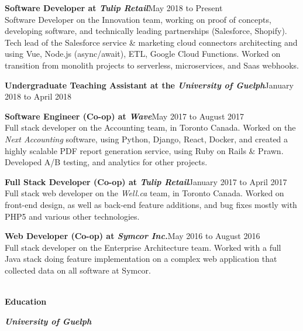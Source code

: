\documentclass[9pt]{extarticle}
\begin{document}
{    \textbf{Software Developer at \textit{Tulip Retail}}{\color{darkgrey}\hfill{\small{May 2018 to Present\\[5pt]}}
        Software Developer on the Innovation team, working on proof of concepts, developing software, and technically leading partnerships (Salesforce, Shopify). Tech lead of the Salesforce service \& marketing cloud connectors architecting and using Vue, Node.js (async/await), ETL, Google Cloud Functions. Worked on transition from monolith projects to serverless, microservices, and Saas webhooks.
    }

    \textbf{Undergraduate Teaching Assistant at the \textit{University of Guelph}}{\color{darkgrey}\hfill{\small{January 2018 to April 2018}}
    }

    \textbf{Software Engineer (Co-op) at \textit{Wave}}{\color{darkgrey}\hfill{\small{May 2017 to August 2017\\[5pt]}}
        Full stack developer on the Accounting team, in Toronto Canada. Worked on the \textit{Next Accounting} software, using Python, Django, React, Docker, and created a highly scalable PDF report generation service, using Ruby on Rails \& Prawn. Developed A/B testing, and analytics for other projects.\\
    }

    \textbf{Full Stack Developer (Co-op) at \textit{Tulip Retail}}{\color{darkgrey}\hfill{\small{January 2017 to April 2017\\[5pt]}}
        Full stack web developer on the \textit{Well.ca} team, in Toronto Canada. Worked on front-end design, as well as back-end feature additions, and bug fixes mostly with PHP5 and various other technologies. \\
    }

    \textbf{Web Developer (Co-op) at \textit{Symcor Inc.}}{\color{darkgrey}\hfill{\small{May 2016 to August 2016\\[5pt]}}
        Full stack developer on the Enterprise Architecture team. Worked with a full Java stack doing feature implementation on a complex web application that collected data on all software at Symcor. \\
    }

    {\color{lightgrey}{\centerline{\rule{17cm}{0.4pt}}}}
    \begin{Large}
        \color{em-light}\textbf{\\[5pt]Education\\}
    \end{Large}

    \textit{\textbf{University of Guelph}}{}
}
\end{document}

